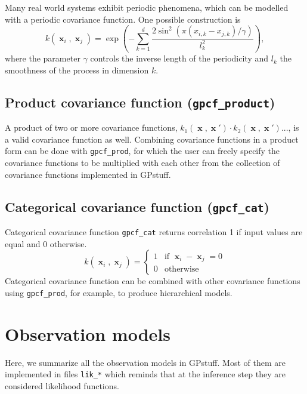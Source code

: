 \documentclass[twoside,11pt]{article}
\DeclareMathOperator{\x}{\mathbf{x}}
\newcommand{\code}[1]{{\normalfont\texttt{#1}}}
\begin{document}
Many real world systems exhibit periodic phenomena, which can be
modelled with a periodic covariance function.  One possible
construction \citep{Rasmussen+Williams:2006} is
%
\begin{equation}
%
k(\x_i,\x_j) = \exp \left( - \sum_{k=1}^d \frac{2 \sin^2(\pi (x_{i,k}-x_{j,k})
    / \gamma)}{l_k^2} \right),
%
\end{equation}
%
where the parameter $\gamma$ controls the inverse length of the
periodicity and $l_k$ the smoothness of the process in dimension $k$.

\subsection*{Product covariance function (\code{gpcf\_product})}

A product of two or more covariance functions, $k_1(\x,\x') \cdot
k_2(\x,\x')...$, is a valid covariance function as well.  Combining
covariance functions in a product form can be done with
\code{gpcf\_prod}, for which the user can freely specify the
covariance functions to be multiplied with each other from the
collection of covariance functions implemented in GPstuff.

\subsection*{Categorical covariance function (\code{gpcf\_cat})}

Categorical covariance function \code{gpcf\_cat} returns
correlation 1 if input values are equal and 0 otherwise.
\begin{equation}
  k(\x_i,\x_j) =
  \begin{cases}
    1 & \text{if }\x_i-\x_j=0 \\
    0 & \text{otherwise}
  \end{cases}
\end{equation}
Categorical covariance function can be combined with other
covariance functions using \code{gpcf\_prod}, for example, to
produce hierarchical models.


\section{Observation models}

Here, we summarize all the observation models in GPstuff. Most
of them are implemented in files \code{lik\_*} which reminds that
at the inference step they are considered likelihood functions.
\end{document}
